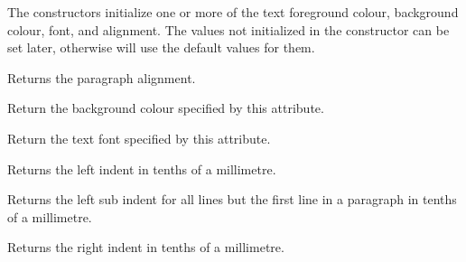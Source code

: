 

\label{wxtextattrctor}



The constructors initialize one or more of the text foreground colour, background
colour, font, and alignment. The values not initialized in the constructor can be set
later, otherwise  will use
the default values for them.


\label{wxtextattrgetalignment}


Returns the paragraph alignment.


\label{wxtextattrgetbackgroundcolour}


Return the background colour specified by this attribute.


\label{wxtextattrgetfont}


Return the text font specified by this attribute.


\label{wxtextattrgetleftindent}


Returns the left indent in tenths of a millimetre.


\label{wxtextattrgetleftsubindent}


Returns the left sub indent for all lines but the first line in a paragraph in
tenths of a millimetre.


\label{wxtextattrgetrightindent}


Returns the right indent in tenths of a millimetre.


